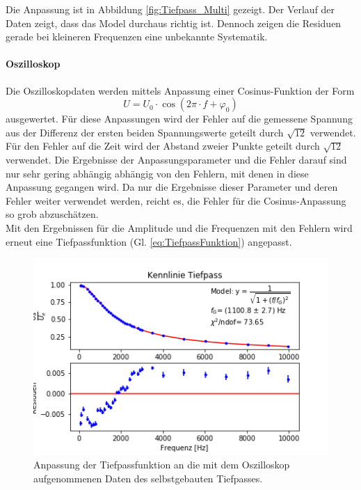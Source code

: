 \documentclass[12pt,a4paper]{article}
\begin{document}
Die Anpassung ist in Abbildung \ref{fig:Tiefpass_Multi} gezeigt. Der Verlauf der Daten zeigt, dass das Model durchaus richtig ist. Dennoch zeigen die Residuen gerade bei kleineren Frequenzen eine unbekannte Systematik.

\paragraph{Oszilloskop}
Die Oszilloskopdaten werden mittels Anpassung einer Cosinus-Funktion der Form
\begin{equation*}
U = U_0 \cdot \cos \left( 2 \pi \cdot f  + \varphi _0 \right)
\end{equation*}
ausgewertet. Für diese Anpassungen wird der Fehler auf die gemessene Spannung aus der Differenz der ersten beiden Spannungswerte geteilt durch $\sqrt{12}$ verwendet. Für den Fehler auf die Zeit wird der Abstand zweier Punkte geteilt durch $\sqrt{12}$ verwendet. Die Ergebnisse der Anpassungsparameter und die Fehler darauf sind nur sehr gering abhängig abhängig von den Fehlern, mit denen in diese Anpassung gegangen wird. Da nur die Ergebnisse dieser Parameter und deren Fehler weiter verwendet werden, reicht es, die Fehler für die Cosinus-Anpassung so grob abzuschätzen. \\
Mit den Ergebnissen für die Amplitude und die Frequenzen mit den Fehlern wird erneut eine Tiefpassfunktion (Gl. \ref{eq:TiefpassFunktion}) angepasst.

\begin{figure}
\centering
\includegraphics[scale=1]{Bilder/Vorversuch1/TiefpassOszi.png}
\caption[test]{Anpassung der Tiefpassfunktion an die mit dem Oszilloskop aufgenommenen Daten des selbstgebauten Tiefpasses.}
\label{fig:Tiefpass_Oszi}
\end{figure}
\end{document}
